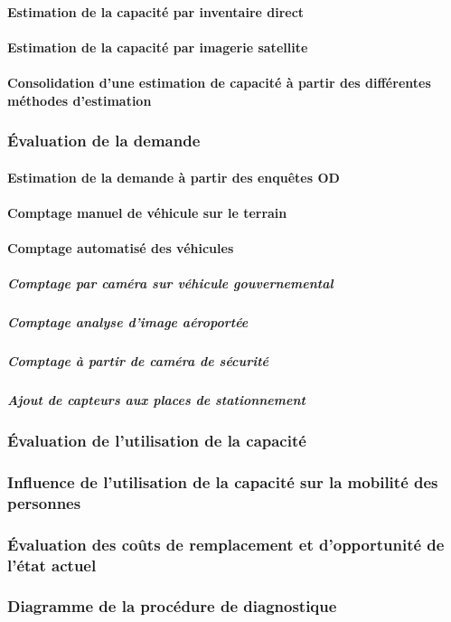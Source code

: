     \paragraph{Estimation de la capacité par inventaire direct}
    \paragraph{Estimation de la capacité par imagerie satellite}
    \paragraph{Consolidation d'une estimation de capacité à partir des différentes méthodes d'estimation}
  \subsubsection{Évaluation de la demande}
    \paragraph{Estimation de la demande à partir des enquêtes OD}
    \paragraph{Comptage manuel de véhicule sur le terrain}
    \paragraph{Comptage automatisé des véhicules}
      \subparagraph{Comptage par caméra sur véhicule gouvernemental}
      \subparagraph{Comptage analyse d'image aéroportée}
      \subparagraph{Comptage à partir de caméra de sécurité}
      \subparagraph{Ajout de capteurs aux places de stationnement}
  \subsubsection{Évaluation de l'utilisation de la capacité}
  \subsubsection{Influence de l'utilisation de la capacité sur la mobilité des personnes}
  \subsubsection{Évaluation des coûts de remplacement et d'opportunité de l'état actuel}
  \subsubsection{Diagramme de la procédure de diagnostique}
